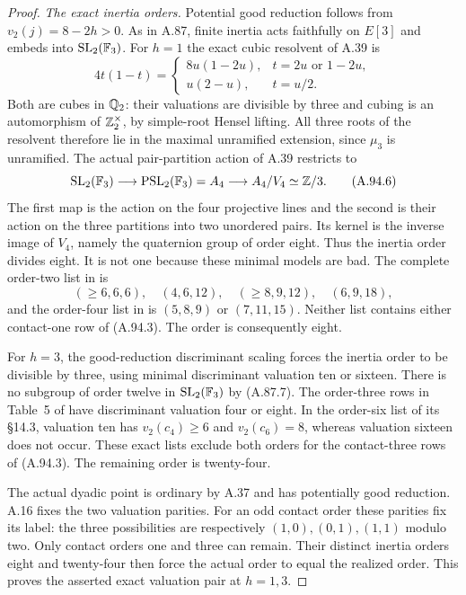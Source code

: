 \begin{proof}
\emph{The exact inertia orders.}
Potential good reduction follows from
$v_2(j)=8-2h>0$.
As in A.87, finite inertia acts faithfully on $E[3]$
and embeds into $\mathrm{SL}_2(\mathbb F_3)$.
For $h=1$ the exact cubic resolvent of A.39 is
\[
 4t(1-t)=
 \begin{cases}
 8u(1-2u),&t=2u\text{ or }1-2u,\\
 u(2-u),&t=u/2.
 \end{cases}
\tag{A.94.5}
\]
Both are cubes in $\mathbb Q_2$: their valuations are
divisible by three and cubing is an automorphism
of $\mathbb Z_2^\times$, by simple-root Hensel lifting.
All three roots of the resolvent therefore lie
in the maximal unramified extension, since
$\mu_3$ is unramified.
The actual pair-partition action of A.39 restricts to
\[
 \mathrm{SL}_2(\mathbb F_3)\longrightarrow
       \mathrm{PSL}_2(\mathbb F_3)=A_4
                  \longrightarrow A_4/V_4\simeq\mathbb Z/3.
\tag{A.94.6}
\]
The first map is the action on the four projective
lines and the second is their action on the three
partitions into two unordered pairs.
Its kernel is the inverse image of $V_4$, namely
the quaternion group of order eight.
Thus the inertia order divides eight.
It is not one because these minimal models are bad.
The complete order-two list in
\cite[\S14.2, equation (14.3)]{LegFreitasKraus2022}
is
\[
 (\ge6,6,6),\quad(4,6,12),\quad
               (\ge8,9,12),\quad(6,9,18),
\tag{A.94.7}
\]
and the order-four list in
\cite[Theorem~6]{LegFreitasKraus2022}
is $(5,8,9)$ or $(7,11,15)$.
Neither list contains either contact-one row of
(A.94.3).  The order is consequently eight.

For $h=3$, the good-reduction discriminant scaling
forces the inertia order to be divisible by three,
using minimal discriminant valuation ten or sixteen.
There is no subgroup of order twelve in
$\mathrm{SL}_2(\mathbb F_3)$ by (A.87.7).
The order-three rows in Table~5 of
\cite{LegFreitasKraus2022} have discriminant
valuation four or eight.
In the order-six list of its \S14.3,
valuation ten has $v_2(c_4)\ge6$ and $v_2(c_6)=8$,
whereas valuation sixteen does not occur.
These exact lists exclude both orders for
the contact-three rows of (A.94.3).
The remaining order is twenty-four.

The actual dyadic point is ordinary by A.37 and
has potentially good reduction.
A.16 fixes the two valuation parities.
For an odd contact order these parities fix its
label: the three possibilities are respectively
$(1,0),(0,1),(1,1)$ modulo two.
Only contact orders one and three can remain.
Their distinct inertia orders eight and twenty-four
then force the actual order to equal the realized
order.  This proves the asserted exact valuation
pair at $h=1,3$.


\end{proof}
